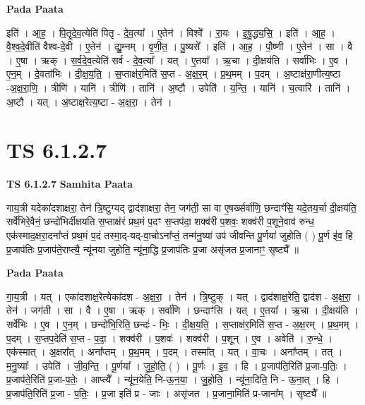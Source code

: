 \documentclass[17pt]{extarticle}
\begin{document}
\textbf{Pada Paata} \newline

इति॑ । आ॒ह॒ । पि॒तृ॒दे॒व॒त्येति॑ पितृ - दे॒व॒त्या᳚ । ए॒तेन॑ । विश्वे᳚ । रा॒यः । इ॒षु॒द्ध्य॒सि॒ । इति॑ । आ॒ह॒ । वै॒श्व॒दे॒वीति॑ वैश्व-दे॒वी । ए॒तेन॑ । द्यु॒म्नम् । वृ॒णी॒त॒ । पु॒ष्यसे᳚ । इति॑ । आ॒ह॒ । पौ॒ष्णी । ए॒तेन॑ । सा । वै । ए॒षा । ऋक् । स॒र्व॒दे॒व॒त्येति॑ सर्व - दे॒व॒त्या᳚ । यत् । ए॒तया᳚ । ऋ॒चा । दी॒क्षय॑ति । सर्वा॑भिः । ए॒व । ए॒न॒म् । दे॒वता॑भिः । दी॒क्ष॒य॒ति॒ । स॒प्ताक्ष॑र॒मिति॑ स॒प्त - अ॒क्ष॒र॒म् । प्र॒थ॒मम् । प॒दम् । अ॒ष्टाक्ष॑रा॒णीत्य॒ष्टा -अ॒क्ष॒रा॒णि॒ । त्रीणि॑ । यानि॑ । त्रीणि॑ । तानि॑ । अ॒ष्टौ । उपेति॑ । य॒न्ति॒ । यानि॑ । च॒त्वारि॑ । तानि॑ । अ॒ष्टौ । यत् । अ॒ष्टाक्ष॒रेत्य॒ष्टा - अ॒क्ष॒रा॒ । तेन॑ ।  \newline





\section{ TS 6.1.2.7 }

\textbf{TS 6.1.2.7 } \newline
\textbf{Samhita Paata} \newline

गाय॒त्री यदेका॑दशाक्षरा॒ तेन॑ त्रि॒ष्टुग्यद् द्वाद॑शाक्षरा॒ तेन॒ जग॑ती॒ सा वा ए॒षर्ख्सर्वा॑णि॒ छन्दाꣳ॑सि॒ यदे॒तय॒र्चा दी॒क्षय॑ति॒ सर्वे॑भिरे॒वैनं॒ छन्दो॑भिर्दीक्षयति स॒प्ताक्ष॑रं प्रथ॒मं प॒दꣳ स॒प्तप॑दा॒ शक्व॑री प॒शवः॒ शक्व॑री प॒शूने॒वाव॑ रुन्ध॒ एक॑स्माद॒क्षरा॒दना᳚प्तं प्रथ॒मं प॒दं तस्मा॒द्-यद्-वा॒चोऽना᳚प्तं॒ तन्म॑नु॒ष्या॑ उप॑ जीवन्ति पू॒र्णया॑ जुहोति ( ) पू॒र्ण इ॑व॒ हि प्र॒जाप॑तिः प्र॒जाप॑ते॒राप्त्यै॒ न्यू॑नया जुहोति॒ न्यू॑ना॒द्धि प्र॒जाप॑तिः प्र॒जा असृ॑जत प्र॒जानाꣳ॒॒ सृष्ट्यै᳚ ॥ \newline

\textbf{Pada Paata} \newline

गा॒य॒त्री । यत् । एका॑दशाक्ष॒रेत्येका॑दश - अ॒क्ष॒रा॒ । तेन॑ । त्रि॒ष्टुक् । यत् । द्वाद॑शाक्ष॒रेति॒ द्वाद॑श - अ॒क्ष॒रा॒ । तेन॑ । जग॑ती । सा । वै । ए॒षा । ऋक् । सर्वा॑णि । छन्दाꣳ॑सि । यत् । ए॒तया᳚ । ऋ॒चा । दी॒क्षय॑ति । सर्वे॑भिः । ए॒व । ए॒न॒म् । छन्दो॑भि॒रिति॒ छन्दः॑ - भिः॒ । दी॒क्ष॒य॒ति॒ । स॒प्ताक्ष॑र॒मिति॑ स॒प्त - अ॒क्ष॒रम् । प्र॒थ॒मम् । प॒दम् । स॒प्तप॒देति॑ स॒प्त - प॒दा॒ । शक्व॑री । प॒शवः॑ । शक्व॑री । प॒शून् । ए॒व । अवेति॑ । रु॒न्धे॒ । एक॑स्मात् । अ॒क्षरा᳚त् । अना᳚प्तम् । प्र॒थ॒मम् । प॒दम् । तस्मा᳚त् । यत् । वा॒चः । अना᳚प्तम् । तत् । म॒नु॒ष्याः᳚ । उपेति॑ । जी॒व॒न्ति॒ । पू॒र्णया᳚ । जु॒हो॒ति॒ ( ) । पू॒र्णः । इ॒व॒ । हि । प्र॒जाप॑ति॒रिति॑ प्र॒जा-प॒तिः॒ । प्र॒जाप॑ते॒रिति॑ प्र॒जा-प॒तेः॒ । आप्त्यै᳚ । न्यू॑न॒येति॒ नि-ऊ॒न॒या॒ । जु॒हो॒ति॒ । न्यू॑ना॒दिति॒ नि - ऊ॒ना॒त् । हि । प्र॒जाप॑ति॒रिति॑ प्र॒जा - प॒तिः॒ । प्र॒जा इति॑ प्र - जाः । असृ॑जत । प्र॒जाना॒मिति॑ प्र-जाना᳚म् । सृष्ट्यै᳚ ॥  \newline
\end{document}
